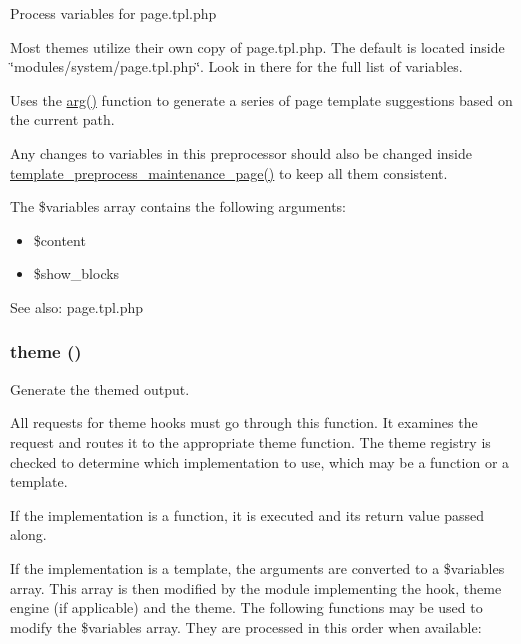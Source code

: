 Process variables for page.tpl.php

Most themes utilize their own copy of page.tpl.php. The default is located inside \char`\"{}modules/system/page.tpl.php\char`\"{}. Look in there for the full list of variables.

Uses the \hyperlink{path_8inc_fd40bf1dc5dc1f68fb326a8f6e0b88da}{arg()} function to generate a series of page template suggestions based on the current path.

Any changes to variables in this preprocessor should also be changed inside \hyperlink{theme_8maintenance_8inc_14a92df5f5e74cebcf7fb680885e58a5}{template\_\-preprocess\_\-maintenance\_\-page()} to keep all them consistent.

The \$variables array contains the following arguments:\begin{itemize}
\item \$content\item \$show\_\-blocks\end{itemize}


\begin{Desc}
\item[See also:]page.tpl.php \end{Desc}
\hypertarget{includes_2theme_8inc_0512a0a56fd1e056cb48bcb694fa8b12}{
\subsubsection[{theme}]{\setlength{\rightskip}{0pt plus 5cm}theme ()}}
\label{includes_2theme_8inc_0512a0a56fd1e056cb48bcb694fa8b12}


Generate the themed output.

All requests for theme hooks must go through this function. It examines the request and routes it to the appropriate theme function. The theme registry is checked to determine which implementation to use, which may be a function or a template.

If the implementation is a function, it is executed and its return value passed along.

If the implementation is a template, the arguments are converted to a \$variables array. This array is then modified by the module implementing the hook, theme engine (if applicable) and the theme. The following functions may be used to modify the \$variables array. They are processed in this order when available:

